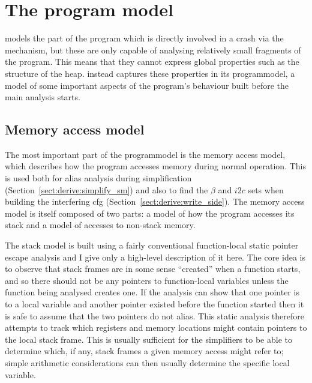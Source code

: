 \section{The program model}
\label{sect:program_model}


{\Technique} models the part of the program which is directly involved
in a crash via the {\StateMachine} mechanism, but these are only
capable of analysing relatively small fragments of the program.  This
means that they cannot express global properties such as the structure
of the heap.  {\Technique} instead captures these properties in its
\gls{programmodel}, a model of some important aspects of the program's
behaviour built before the main analysis starts.


\subsection{Memory access model}
\label{sect:program_model:dynamic_alias}

The most important part of the \gls{programmodel} is the memory access
model, which describes how the program accesses memory during normal
operation.  This is used both for alias analysis during
{\StateMachine} simplification (Section~\ref{sect:derive:simplify_sm})
and also to find the $\beta$ and $i2c$ sets when building the
interfering \gls{cfg} (Section~\ref{sect:derive:write_side}).  The
memory access model is itself composed of two parts: a model of how
the program accesses its stack and a model of accesses to non-stack
memory.

The stack model is built using a fairly conventional function-local
static pointer escape analysis\needCite{} and I give only a high-level
description of it here.  The core idea is to observe that stack frames
are in some sense ``created'' when a function starts, and so there
should not be any pointers to function-local variables unless the
function being analysed creates one.  If the analysis can show that
one pointer is to a local variable and another pointer existed before
the function started then it is safe to assume that the two pointers
do not alias.  This static analysis therefore attempts to track which
registers and memory locations might contain pointers to the local
stack frame.  This is usually sufficient for the {\StateMachine}
simplifiers to be able to determine which, if any, stack frames a
given memory access might refer to; simple arithmetic considerations
can then usually determine the specific local variable.

